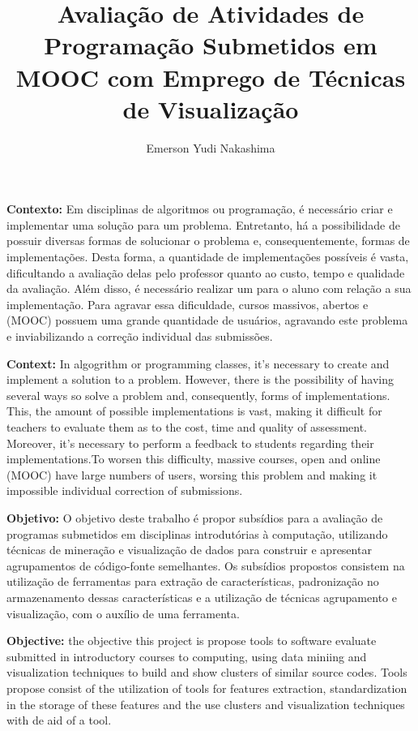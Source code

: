 \documentclass[12pt,english,brazil,a4paper,utf8,oneside]{utfpr-tcc}
\author{Emerson Yudi Nakashima}  %
\title{Avaliação de Atividades de Programação Submetidos em MOOC com Emprego de Técnicas de Visualização} %
\begin{document}
	
\frontmatter
\maketitle

\begin{resumo}
\textbf{Contexto:} Em disciplinas de algoritmos ou programação, é necessário criar
e implementar uma solução para um problema. Entretanto, há a possibilidade de possuir
diversas formas de solucionar o problema e, consequentemente, formas de implementações.
Desta forma, a quantidade de implementações possíveis é vasta, dificultando a avaliação
delas pelo professor quanto ao custo, tempo e qualidade da avaliação. Além disso, é
necessário realizar um  para o aluno com relação a sua implementação.
Para agravar essa dificuldade, cursos massivos, abertos e  (MOOC)
possuem uma grande quantidade de usuários, agravando este problema e inviabilizando
a correção individual das submissões.

\textbf{Context:} In algogrithm or programming classes, it's necessary to create and
implement a solution to a problem. However, there is the possibility of having several
ways so solve a problem and, consequently, forms of implementations. This, the amount
of possible implementations is vast, making it difficult for teachers to evaluate them
as to the cost, time and quality of assessment. Moreover, it's necessary to perform a
feedback to students regarding their implementations.To worsen this difficulty,
massive courses, open and online (\acs{MOOC}) have large numbers of users, worsing this
problem and making it impossible individual correction of submissions.

\textbf{Objetivo:} O objetivo deste trabalho é propor subsídios para a avaliação de
programas submetidos em disciplinas introdutórias à computação, utilizando técnicas
de mineração e visualização de dados para construir e apresentar agrupamentos de
código-fonte semelhantes. Os subsídios propostos consistem na utilização de ferramentas
para extração de características, padronização no armazenamento dessas características
e a utilização de técnicas agrupamento e visualização, com o auxílio de uma ferramenta.

\textbf{Objective:} the objective this project is propose tools to software evaluate
submitted in introductory courses to computing, using data miniing and visualization
techniques to build and show clusters of similar source codes. Tools propose consist
of the utilization of tools for features extraction, standardization in the storage
of these features and the use clusters and visualization techniques with de aid of
a tool.


\end{resumo}
\end{document}
